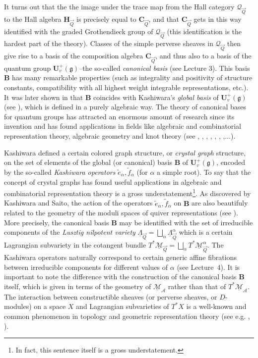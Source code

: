 \documentclass[a4paper,10pt]{amsart}
\def\H{\mathbf{H}}
\def\U{\mathbf{U}}
\def\A{\mathcal{A}}
\def\g{\mathfrak{g}}
\numberwithin{equation}{section}
\begin{document}
It turns out that the the image under the trace map from the Hall category $\mathcal{Q}_{\vec{Q}}$ to the Hall algebra $\H_{\vec{Q}}$ is precisely equal to $\mathbf{C}_{\vec{Q}}$, and that $\mathbf{C}_{\vec{Q}}$ gets in this way identified with the graded Grothendieck group of $\mathcal{Q}_{\vec{Q}}$ (this identification is the hardest part of the theory). Classes of the simple perverse sheaves in $\mathcal{Q}_{\vec{Q}}$ then give rise to a basis of the composition algebra $\mathbf{C}_{\vec{Q}}$, and thus also to a basis of the quantum group $ \U^+_v(\g)$--the so-called \textit{canonical basis} (see Lecture 3). This basis $\mathbf{B}$ has many remarkable properties (such as integrality and positivity of structure constants, compatibility with all highest weight integrable representations, etc.). It was later shown in \cite{GL} that $\mathbf{B}$ coincides with Kashiwara's \textit{global basis} of $ \U^+_v(\g)$ (see \cite{Kas}), which is defined in a purely algebraic way. The theory of canonical bases for quantum groups has attracted an enormous amount of research since its invention and has found applications in fields like algebraic and combinatorial representation theory, algebraic geometry and knot theory (see \cite{LLT}, \cite{Ariki}, \cite{VV}, \cite{Caldero}, \cite{FrenkelK}, \cite{FZ}, \cite{Lustot},...).

\vspace{.2in}

Kashiwara defined a certain colored graph structure, or \textit{crystal graph} structure, on the set of elements of the global (or canonical) basis $\mathbf{B}$ of $ \U^+_v(\g)$, encoded by the so-called \textit{Kashiwara operators} $\tilde{e}_{\alpha}, \tilde{f}_{\alpha}$ (for $\alpha$ a simple root). To say that the concept of crystal graphs has found useful applications in algebraic and 
combinatorial representation theory is a gross understatement\footnote{In fact, this sentence itself is a gross understatement.}.
As discovered by Kashiwara and Saito, the action of the operators $\tilde{e}_{\alpha}, \tilde{f}_{\alpha}$ on $\mathbf{B}$ are also beautifuly related to the geometry of the moduli spaces of quiver representations (see \cite{KS}). More precisely, the canonical basis $\mathbf{B}$ may be identified with the set of irreducible components of the \textit{Lusztig nilpotent variety} $\underline{\Lambda}_{\vec{Q}}=\bigsqcup_{\alpha} \underline{\Lambda}^{\alpha}_{\vec{Q}}$ which is a certain Lagrangian subvariety in the cotangent bundle $T^*\underline{\mathcal{M}}_{\vec{Q}}=\bigsqcup_{\alpha} T^* \underline{\mathcal{M}}^{\alpha}_{\vec{Q}}$. The Kashiwara operators naturally correspond to certain generic affine fibrations between irreducible components for different values of $\alpha$ (see Lecture~4). It is important to note the difference with the construction of the canonical basis $\mathbf{B}$ itself, which is given in terms of the geometry of $\underline{\mathcal{M}}_{\A}$ rather than that of $T^*\underline{\mathcal{M}}_{\A}$. The interaction between constructible sheaves (or perverse sheaves, or $D$-modules) on a space $X$ and Lagrangian subvarieties of $T^*X$ is a well-known and common phenomenon in topology and geometric representation theory (see e.g. \cite{KasShap}, \cite{Nadler}). 
\end{document}
